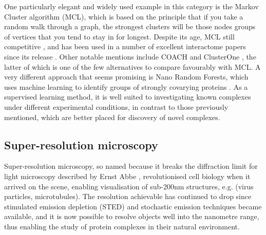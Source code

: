 \documentclass[a4paper,11pt,twoside,openright]{scrbook}
\begin{document}
One particularly elegant and widely used example in this category is the Markov Cluster algorithm \cite{VanDongen2000} (MCL), which is based on the principle that if you take a random walk through a graph, the strongest clusters will be those nodes groups of vertices that you tend to stay in for longest. Despite its age, MCL still competitive \cite{Li2010}, and has been used in a number of excellent interactome papers since its release \cite{Krogan2006,Wan2015}. Other notable mentions include COACH and ClusterOne \cite{Wu2009,Nepusz2012}, the latter of which is one of the few alternatives to compare favourably with MCL. A very different approach that seems promising is Nano Random Forests, which uses machine learning to identify groups of strongly covarying proteins \cite{Montano-Gutierrez2017}. As a supervised learning method, it is well suited to investigating known complexes under different experimental conditions, in contrast to those previously mentioned, which are better placed for discovery of novel complexes.

\subsection{Super-resolution microscopy}
Super-resolution microscopy, so named because it breaks the diffraction limit for light microscopy described by Ernst Abbe \cite{Abbe1873}, revolutionised cell biology when it arrived on the scene, enabling visualisation of sub-200nm structures, e.g. (virus particles, microtubules). The resolution achievable has continued to drop since stimulated emission depletion \cite{Hell1994} (STED) and stochastic emission techniques \cite{Rust2006,Hess2006,Betzig2006} became available, and it is now possible to resolve objects well into the nanometre range, thus enabling the study of protein complexes in their natural environment.
\end{document}
